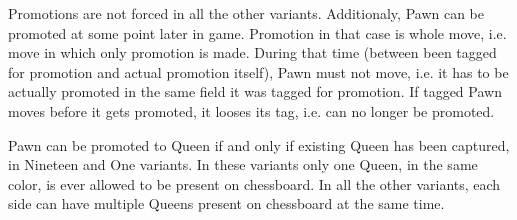 Promotions are not forced in all the other variants. Additionaly, Pawn can be promoted
at some point later in game. Promotion in that case is whole move, i.e. move in which
only promotion is made. During that time (between been tagged for promotion and actual
promotion itself), Pawn must not move, i.e. it has to be actually promoted in the same
field it was tagged for promotion. If tagged Pawn moves before it gets promoted, it
looses its tag, i.e. can no longer be promoted.

Pawn can be promoted to Queen if and only if existing Queen has been captured, in
Nineteen and One variants. In these variants only one Queen, in the same color, is
ever allowed to be present on chessboard. In all the other variants, each side can
have multiple Queens present on chessboard at the same time.










\clearpage %
